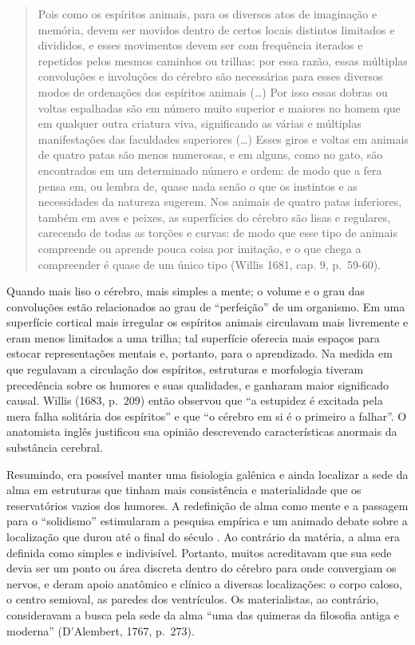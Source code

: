 \begin{quote}
Pois como os espíritos animais, para os diversos atos de imaginação e
memória, devem ser movidos dentro de certos locais distintos limitados e
divididos, e esses movimentos devem ser com frequência iterados e
repetidos pelos mesmos caminhos ou trilhas: por essa razão, essas
múltiplas convoluções e involuções do cérebro são necessárias para esses
diversos modos de ordenações dos espíritos animais (\ldots{}) Por isso essas
dobras ou voltas espalhadas são em número muito superior e maiores no
homem que em qualquer outra criatura viva, significando as várias e
múltiplas manifestações das faculdades superiores (\ldots{}) Esses giros e
voltas em animais de quatro patas são menos numerosas, e em alguns, como
no gato, são encontrados em um determinado número e ordem: de modo que a
fera pensa em, ou lembra de, quase nada senão o que os instintos e as
necessidades da natureza sugerem. Nos animais de quatro patas
inferiores, também em aves e peixes, as superfícies do cérebro são lisas
e regulares, carecendo de todas as torções e curvas: de modo que esse
tipo de animais compreende ou aprende pouca coisa por imitação, e o que
chega a compreender é quase de um único tipo (Willis 1681, cap. 9,
p.~59-60).
\end{quote}

Quando mais liso o cérebro, mais simples a mente; o volume e o grau das
convoluções estão relacionados ao grau de ``perfeição'' de um organismo.
Em uma superfície cortical mais irregular os espíritos animais
circulavam mais livremente e eram menos limitados a uma trilha; tal
superfície oferecia mais espaços para estocar representações mentais e,
portanto, para o aprendizado. Na medida em que regulavam a circulação
dos espíritos, estruturas e morfologia tiveram precedência sobre os
humores e suas qualidades, e ganharam maior significado causal. Willis
(1683, p.~209) então observou que ``a estupidez é excitada pela mera
falha solitária dos espíritos'' e que ``o cérebro em si é o primeiro a
falhar''. O anatomista inglês justificou sua opinião descrevendo
características anormais da substância cerebral.

Resumindo, era possível manter uma fisiologia galênica e ainda localizar
a sede da alma em estruturas que tinham mais consistência e
materialidade que os reservatórios vazios dos humores. A redefinição de
alma como mente e a passagem para o ``solidismo'' estimularam a pesquisa
empírica e um animado debate sobre a localização que durou até o final
do século . Ao contrário da matéria, a alma era definida como
simples e indivisível. Portanto, muitos acreditavam que sua sede devia
ser um ponto ou área discreta dentro do cérebro para onde convergiam os
nervos, e deram apoio anatômico e clínico a diversas localizações: o
corpo caloso, o centro semioval, as paredes dos ventrículos. Os
materialistas, ao contrário, consideravam a busca pela sede da alma
``uma das quimeras da filosofia antiga e moderna'' (D'Alembert, 1767,
p.~273).

